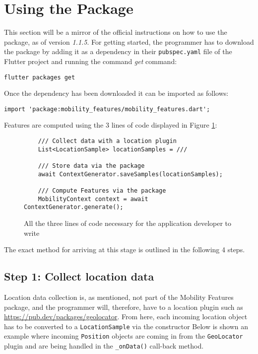 \section{Using the Package}
This section will be a mirror of the official instructions on how to use the package, as of version \textit{1.1.5}. For getting started, the programmer has to download the package by adding it as a dependency in their \verb|pubspec.yaml| file of the Flutter project and running the command \textit{get} command:

\begin{verbatim}
flutter packages get
\end{verbatim}

Once the dependency has been downloaded it can be imported as follows:

\begin{verbatim}
import 'package:mobility_features/mobility_features.dart';
\end{verbatim}

Features are computed using the 3 lines of code displayed in Figure \ref{fig:code-example-intro}:

\begin{figure}[h]
    \centering
    \begin{verbatim}
    /// Collect data with a location plugin
    List<LocationSample> locationSamples = ///

    /// Store data via the package
    await ContextGenerator.saveSamples(locationSamples);
    
    /// Compute Features via the package
    MobilityContext context = await ContextGenerator.generate();
    \end{verbatim}
    \caption{All the three lines of code necessary for the application developer to write}
    \label{fig:code-example-intro}
\end{figure}

The exact method for arriving at this stage is outlined in the following 4 steps.

\subsection*{Step 1: Collect location data}
Location data collection is, as mentioned, not part of the Mobility Features package, and the programmer will, therefore, have to a location plugin such as \url{https://pub.dev/packages/geolocator}. From here, each incoming location object has to be converted to a \verb|LocationSample| via the constructor
Below is shown an example where incoming \verb|Position| objects are coming in from the \verb|GeoLocator| plugin and are being handled in the \verb|_onData()| call-back method.

